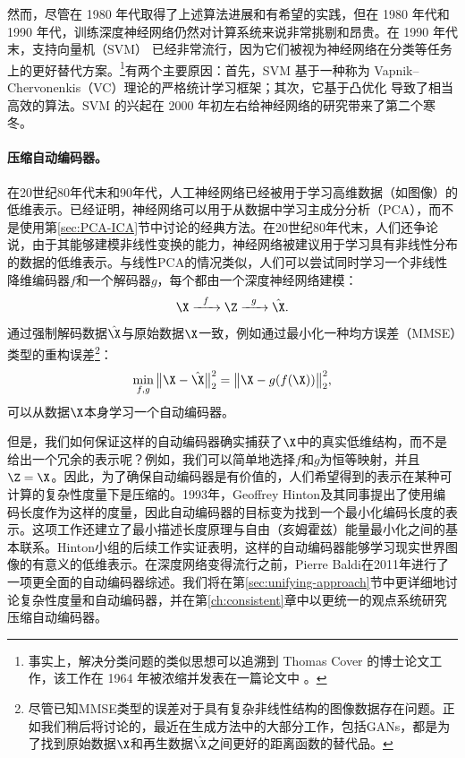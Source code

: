 \documentclass[../../book-main.tex]{subfiles}
\begin{document}
然而，尽管在 1980 年代取得了上述算法进展和有希望的实践，但在 1980 年代和 1990 年代，训练深度神经网络仍然对计算系统来说非常挑剔和昂贵。在 1990 年代末，支持向量机（SVM） \cite{SVM-1995} 已经非常流行，因为它们被视为神经网络在分类等任务上的更好替代方案。\footnote{事实上，解决分类问题的类似思想可以追溯到 Thomas Cover 的博士论文工作，该工作在 1964 年被浓缩并发表在一篇论文中 \cite{Cover-1964}。}有两个主要原因：首先，SVM 基于一种称为 Vapnik--Chervonenkis（VC）理论的严格统计学习框架；其次，它基于凸优化 \cite{BoydVa04} 导致了相当高效的算法。SVM 的兴起在 2000 年初左右给神经网络的研究带来了第二个寒冬。

\paragraph{压缩自动编码器。}
在20世纪80年代末和90年代，人工神经网络已经被用于学习高维数据（如图像）的低维表示。已经证明，神经网络可以用于从数据中学习主成分分析（PCA），而不是使用第\ref{sec:PCA-ICA}节中讨论的经典方法。在20世纪80年代末，人们还争论说，由于其能够建模非线性变换的能力，神经网络被建议用于学习具有非线性分布的数据的低维表示。与线性PCA的情况类似，人们可以尝试同时学习一个非线性降维编码器$f$和一个解码器$g$，每个都由一个深度神经网络建模\cite{Rumelhart1986,Kramer1991NonlinearPC}：
\begin{equation}
    \X   \xrightarrow{\hspace{2mm} f \hspace{2mm}} \Z  \xrightarrow{\hspace{2mm} g \hspace{2mm}} \hat \X.
       \label{eqn:auto-encoding-deep-networks}
\end{equation}
通过强制解码数据$\hat \X$与原始数据$\X$一致，例如通过最小化一种均方误差（MMSE）类型的重构误差\footnote{尽管已知MMSE类型的误差对于具有复杂非线性结构的图像数据存在问题。正如我们稍后将讨论的，最近在生成方法中的大部分工作，包括GANs，都是为了找到原始数据$\X$和再生数据$\hat \X$之间更好的距离函数的替代品。}：
\begin{equation}
    \min_{f,g} \big\|\X - \hat \X\big\|_2^2 = \big\|\X - g(f( \X))\big\|_2^2,
\end{equation}
可以从数据$\X$本身学习一个自动编码器。

但是，我们如何保证这样的自动编码器确实捕获了$\X$中的真实低维结构，而不是给出一个冗余的表示呢？例如，我们可以简单地选择$f$和$g$为恒等映射，并且$\Z = \X$。因此，为了确保自动编码器是有价值的，人们希望得到的表示在某种可计算的复杂性度量下是压缩的。1993年，Geoffrey Hinton及其同事提出了使用编码长度作为这样的度量，因此自动编码器的目标变为找到一个最小化编码长度的表示\cite{Hinton-1993}。这项工作还建立了最小描述长度原理\cite{Rissanen-1978}与自由（亥姆霍兹）能量最小化之间的基本联系。Hinton小组的后续工作\cite{Hinton504}实证表明，这样的自动编码器能够学习现实世界图像的有意义的低维表示。在深度网络变得流行之前，Pierre Baldi在2011年进行了一项更全面的自动编码器综述\cite{Baldi2011}。我们将在第\ref{sec:unifying-approach}节中更详细地讨论复杂性度量和自动编码器，并在第\ref{ch:consistent}章中以更统一的观点系统研究压缩自动编码器。
\end{document}

